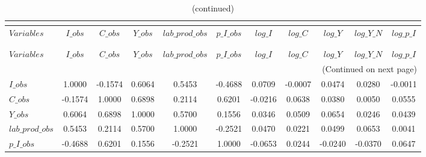  
\begin{center}
\begin{longtable}{lcccccccccc} 
\caption{MATRIX OF CORRELATIONS}\\
 \label{Table:th_corr_matrix}\\
\toprule 
$Variables       $	 & 	 $           I\_obs$	 & 	 $           C\_obs$	 & 	 $           Y\_obs$	 & 	 $  lab\_prod\_obs$	 & 	 $       p\_I\_obs$	 & 	 $           log\_I$	 & 	 $           log\_C$	 & 	 $           log\_Y$	 & 	 $       log\_Y\_N$	 & 	 $       log\_p\_I$\\
\midrule \endfirsthead 
\caption{(continued)}\\
 \toprule \\ 
$Variables       $	 & 	 $           I\_obs$	 & 	 $           C\_obs$	 & 	 $           Y\_obs$	 & 	 $  lab\_prod\_obs$	 & 	 $       p\_I\_obs$	 & 	 $           log\_I$	 & 	 $           log\_C$	 & 	 $           log\_Y$	 & 	 $       log\_Y\_N$	 & 	 $       log\_p\_I$\\
\midrule \endhead 
\midrule \multicolumn{11}{r}{(Continued on next page)} \\ \bottomrule \endfoot 
\bottomrule \endlastfoot 
$I\_obs          $	 & 	            1.0000	 & 	           -0.1574	 & 	            0.6064	 & 	            0.5453	 & 	           -0.4688	 & 	            0.0709	 & 	           -0.0007	 & 	            0.0474	 & 	            0.0280	 & 	           -0.0011 \\ 
$C\_obs          $	 & 	           -0.1574	 & 	            1.0000	 & 	            0.6898	 & 	            0.2114	 & 	            0.6201	 & 	           -0.0216	 & 	            0.0638	 & 	            0.0380	 & 	            0.0050	 & 	            0.0555 \\ 
$Y\_obs          $	 & 	            0.6064	 & 	            0.6898	 & 	            1.0000	 & 	            0.5700	 & 	            0.1556	 & 	            0.0346	 & 	            0.0509	 & 	            0.0654	 & 	            0.0246	 & 	            0.0439 \\ 
$lab\_prod\_obs  $	 & 	            0.5453	 & 	            0.2114	 & 	            0.5700	 & 	            1.0000	 & 	           -0.2521	 & 	            0.0470	 & 	            0.0221	 & 	            0.0499	 & 	            0.0653	 & 	            0.0041 \\ 
$p\_I\_obs       $	 & 	           -0.4688	 & 	            0.6201	 & 	            0.1556	 & 	           -0.2521	 & 	            1.0000	 & 	           -0.0653	 & 	            0.0244	 & 	           -0.0240	 & 	           -0.0370	 & 	            0.0647 \\ 

\end{longtable}
\end{center}

